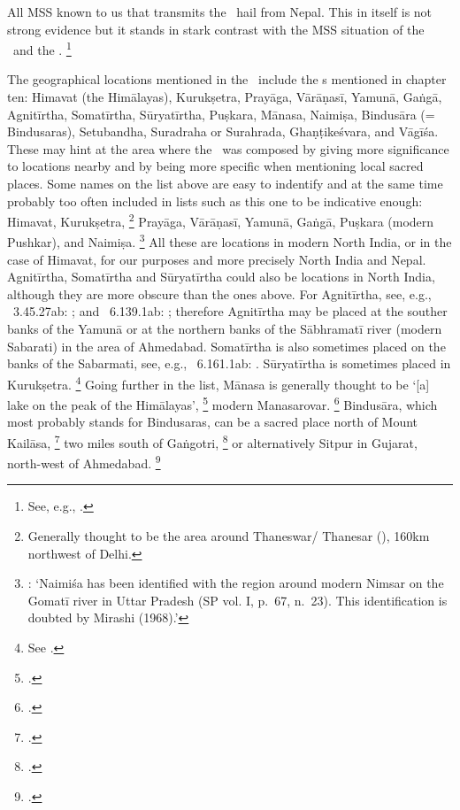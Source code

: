 All MSS known to us that transmits the \VSS\ 
hail from Nepal. This in itself is not strong evidence
but it stands in stark contrast with the MSS situation
of the \SDHS\ and the \SDHU.%
		\footnote{See, e.g., .}

The geographical locations 
mentioned in the \VSS\ include the
s mentioned in chapter ten:
Himavat (the Himālayas),
Kurukṣetra,
Prayāga,
Vārāṇasī,
Yamunā,
Gaṅgā,
Agnitīrtha, %
Somatīrtha, %
Sūryatīrtha, %
Puṣkara, %
Mānasa, %
Naimiṣa, %
Bindusāra (= Bindusaras), %
Setubandha, %
Suradraha or Sura\-hrada, %
Ghaṇṭikeśvara,
and Vāgīśa.
These may hint at the area where the \VSS\ was
composed by giving more significance to 
locations nearby and by being more specific when
mentioning local sacred places.
Some names on the list above are 
easy to indentify and at the same
time probably too often included in lists such as this one
to be indicative enough: 
Himavat, Kurukṣetra,%
	\footnote{Generally thought to be the area
		around Thaneswar\thinspace /\thinspace
		Thanesar (), 
		160km northwest of Delhi.}	
Prayāga, Vārāṇasī, Yamunā,
Gaṅgā, Puṣkara (modern Pushkar), and Naimiṣa.%
		\footnote{: 
		`Naimiśa has been identified with the region around 
		modern Nimsar on the Gomatī river in Uttar Pradesh 			(SP vol. I, p.~67, n.~23). 
		This identification is doubted by Mirashi (1968).'}
All these are locations in modern North India, or in the case of Himavat, for our purposes and 
more precisely North India and Nepal.
Agnitīrtha, Somatīrtha and Sūryatīrtha could also
be locations in North India, although they are
more obscure than the ones above.
For Agnitīrtha, see, e.g., \PadmaP\ 3.45.27ab:      
; and  
\PadmaP\  6.139.1ab:    
; 
therefore Agnitīrtha may be placed at the souther
banks of the Yamunā or at the northern banks of
the Sābhramatī river (modern Sabarati) in the area of
Ahmedabad.
Somatīrtha is also sometimes placed on the banks
of the Sabarmati, see, e.g., \PadmaP\  6.161.1ab:        .
Sūryatīrtha is sometimes placed in Kurukṣetra.%
		\footnote{See 
		.}
Going further in the list, Mānasa is generally thought
to be `[a] lake on the peak of the Himālayas',%
	\footnote{.}
modern Manasarovar.%
	\footnote{.} 
Bindusāra, which most probably stands for
Bindusaras, can be a sacred place north of Mount
Kailāsa,%
	\footnote{.}
two miles south of Gaṅgotri,%
	\footnote{.}
or alternatively Sitpur in Gujarat, north-west of 
Ahmedabad.%
	\footnote{.}
	
